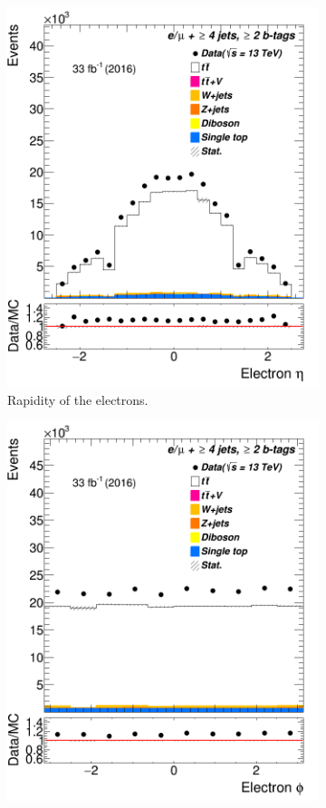 \begin{figure}
\begin{subfigure}{0.25\textwidth}
		\includegraphics[width=\linewidth]{ControlPlots_emujets_2016_4incl_2incl/el_eta_emujets_2016.png}
		\caption{Rapidity of the electrons.} \label{fig:c1}
	\end{subfigure}
	\begin{subfigure}{0.25\textwidth}
		\includegraphics[width=\linewidth]{ControlPlots_emujets_2016_4incl_2incl/el_phi_emujets_2016.png}

\end{subfigure}
\end{figure}
